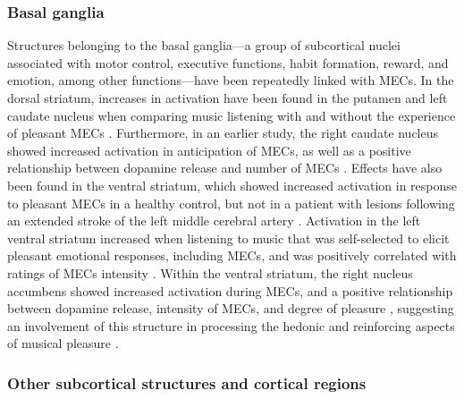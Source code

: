 \subsubsection{Basal ganglia}

Structures belonging to the basal ganglia---a group of subcortical nuclei associated with motor control, executive functions, habit formation, reward, and emotion, among other functions---have been repeatedly linked with MECs. In the dorsal striatum, increases in activation have been found in the putamen and left caudate nucleus when comparing music listening with and without the experience of pleasant MECs \parencite{klepzig2020}. Furthermore, in an earlier study, the right caudate nucleus showed increased activation in anticipation of MECs, as well as a positive relationship between dopamine release and number of MECs \parencite{salimpoor2011}. Effects have also been found in the ventral striatum, which showed increased activation in response to pleasant MECs in a healthy control, but not in a patient with lesions following an extended stroke of the left middle cerebral artery \parencite{grunkina2017}. Activation in the left ventral striatum increased when listening to music that was self-selected to elicit pleasant emotional responses, including MECs, and was positively correlated with ratings of MECs intensity \parencite{blood2001}. Within the ventral striatum, the right nucleus accumbens showed increased activation during MECs, and a positive relationship between dopamine release, intensity of MECs, and degree of pleasure \parencite{salimpoor2011}, suggesting an involvement of this structure in processing the hedonic and reinforcing aspects of musical pleasure \parencite{chanda2013}.

\subsubsection{Other subcortical structures and cortical regions}

